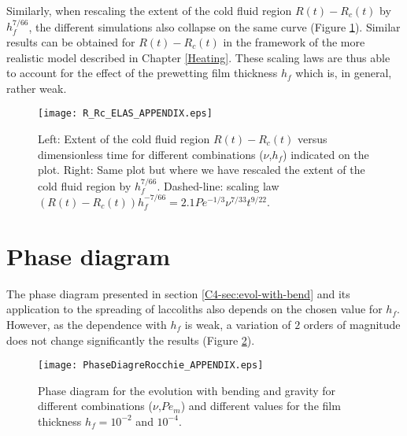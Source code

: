Similarly,  when  rescaling  the  extent  of  the  cold  fluid  region
$R(t)-R_c(t)$ by $h_f^{7/66}$, the different simulations also collapse
on the same curve  (Figure \ref{R_Rc_ELAS_APPENDIX}).  Similar results
can  be  obtained for  $R(t)-R_c(t)$  in  the  framework of  the  more
realistic model described in Chapter \ref{Heating}. These scaling laws
are  thus able  to  account  for the  effect  of  the prewetting  film
thickness $h_f$ which is, in general, rather weak.

\begin{figure}[h!]
  \begin{center}
    \graphicspath{ {/Users/thorey/Documents/These/Projet/Refroidissement/Skin_Model/Figure/JFM_V13/} }
    \texttt{[image: R\_Rc\_ELAS\_APPENDIX.eps]}
    \caption{Left:  Extent  of  the cold  fluid  region  $R(t)-R_c(t)$
      versus   dimensionless    time   for    different   combinations
      ($\nu$,$h_f$) indicated on the plot.  Right: Same plot but where
      we  have  rescaled  the  extent  of the  cold  fluid  region  by
      $h_f^{7/66}$.          Dashed-line:          scaling         law
      $(R(t)-R_c(t))h_f^{-7/66}= 2.1 Pe^{-1/3}\nu^{7/33}t^{9/22}$.}
    \label{R_Rc_ELAS_APPENDIX}
  \end{center}
\end{figure}

\section{Phase diagram}

The phase diagram presented in section \ref{C4-sec:evol-with-bend} and
its application  to the  spreading of laccoliths  also depends  on the
chosen value for $h_f$. However, as the dependence with $h_f$ is weak,
a variation of  $2$ orders of magnitude does  not change significantly
the results (Figure \ref{C3-PhaseDiagramJFM_Appendix}).

\begin{figure}[h!]
  \begin{center}
    \graphicspath{ {/Users/thorey/Documents/These/Projet/Refroidissement/Skin_Model/Figure/Figure_Heating/} }
    \texttt{[image: PhaseDiagreRocchie\_APPENDIX.eps]}
    \caption{Phase diagram for the  evolution with bending and gravity
      for different  combinations ($\nu$,$Pe_m$) and  different values
      for the film thickness $h_f = 10^{-2}$ and $10^{-4}$.}
    \label{C3-PhaseDiagramJFM_Appendix}
  \end{center}
\end{figure}

